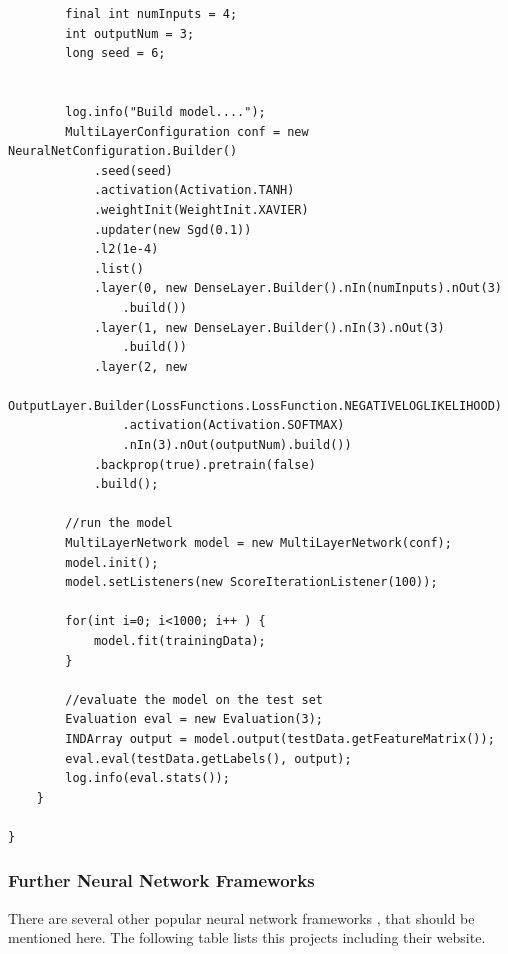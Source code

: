 \begin{verbatim}
        final int numInputs = 4;
        int outputNum = 3;
        long seed = 6;


        log.info("Build model....");
        MultiLayerConfiguration conf = new NeuralNetConfiguration.Builder()
            .seed(seed)
            .activation(Activation.TANH)
            .weightInit(WeightInit.XAVIER)
            .updater(new Sgd(0.1))
            .l2(1e-4)
            .list()
            .layer(0, new DenseLayer.Builder().nIn(numInputs).nOut(3)
                .build())
            .layer(1, new DenseLayer.Builder().nIn(3).nOut(3)
                .build())
            .layer(2, new 
            OutputLayer.Builder(LossFunctions.LossFunction.NEGATIVELOGLIKELIHOOD)
                .activation(Activation.SOFTMAX)
                .nIn(3).nOut(outputNum).build())
            .backprop(true).pretrain(false)
            .build();

        //run the model
        MultiLayerNetwork model = new MultiLayerNetwork(conf);
        model.init();
        model.setListeners(new ScoreIterationListener(100));

        for(int i=0; i<1000; i++ ) {
            model.fit(trainingData);
        }

        //evaluate the model on the test set
        Evaluation eval = new Evaluation(3);
        INDArray output = model.output(testData.getFeatureMatrix());
        eval.eval(testData.getLabels(), output);
        log.info(eval.stats());
    }

}
\end{verbatim}

\subsubsection{Further Neural Network
Frameworks}\label{further-neural-network-frameworks}

There are several other popular neural network frameworks
\cite{dzone-frameworks}, that should be mentioned here. The following
table lists this projects including their website.

